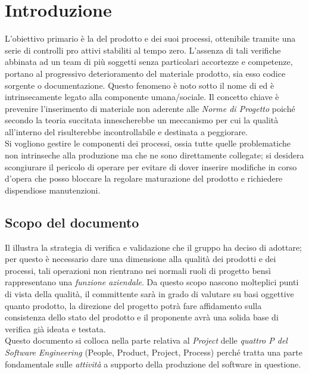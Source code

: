 \section{Introduzione}
 L'obiettivo primario è la  del prodotto e dei suoi processi, ottenibile tramite una serie di controlli pro attivi stabiliti al tempo zero. L'assenza di tali verifiche abbinata ad un team di più soggetti senza particolari accortezze e competenze, portano al progressivo deterioramento del materiale prodotto, sia esso codice sorgente o documentazione. Questo fenomeno è noto sotto il nome di  ed è intrinsecamente legato alla componente umana/sociale. Il concetto chiave è prevenire l'inserimento di materiale non aderente alle \emph{Norme di Progetto} poiché secondo la teoria succitata innescherebbe un meccanismo per cui la qualità all'interno del  risulterebbe incontrollabile e destinata a peggiorare. \\ %
Si vogliono gestire le componenti  dei processi, ossia tutte quelle problematiche non intrinseche alla produzione ma che ne sono direttamente collegate; si desidera scongiurare il pericolo di operare  per evitare di dover inserire modifiche in corso d'opera che posso bloccare la regolare maturazione del prodotto e richiedere dispendiose manutenzioni.

\subsection{Scopo del documento}
Il \DocTitle  illustra la strategia di verifica e validazione che il gruppo \GroupName ha deciso di adottare; per questo è necessario dare una dimensione alla qualità dei prodotti e dei processi, tali operazioni non rientrano nei normali ruoli di progetto bensì rappresentano una \emph{funzione aziendale}. Da questo scopo nascono molteplici punti di vista della qualità, il committente sarà in grado di valutare su basi oggettive quanto prodotto, la direzione del progetto potrà fare affidamento sulla consistenza dello stato del prodotto e il proponente avrà una solida base di verifica già ideata e testata. \\ Questo documento si colloca nella parte relativa al \emph{Project} delle \emph{quattro P del Software Engineering} (People, Product, Project, Process) perché tratta una parte fondamentale sulle \emph{attività} a supporto della produzione del software in questione.

